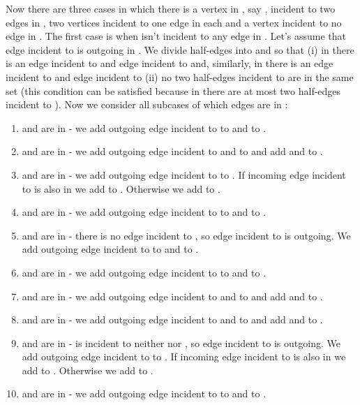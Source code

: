 \documentclass[a4, 11pt]{article}
\newcommand{\<}{\langle}
\renewcommand{\>}{\rangle}
\begin{document}
Now there are three cases in which there is a vertex in , say , incident to two edges in , two vertices incident to one edge in  each and a vertex incident to no edge in . The first case is when  isn't incident to any edge in . Let's assume that edge incident to  is outgoing in . We divide half-edges into  and  so that (i) in  there is an edge incident to  and edge incident to  and, similarly, in  there is an edge incident to  and edge incident to  (ii) no two half-edges incident to  are in the same set (this condition can be satisfied because in  there are at most two half-edges incident to ). Now we consider all subcases of which edges are in :
\begin{enumerate}
	\item  and  are in  - we add outgoing edge incident to  to  and  to .
	\item  and  are in  - we add outgoing edge incident to  and  to  and add  and  to .
	\item  and  are in  - we add outgoing edge incident to  to . If incoming edge incident to  is also in  we add  to . Otherwise we add  to .
	\item  and  are in  - we add outgoing edge incident to  to  and  to .
	\item  and  are in  - there is no edge incident to , so edge incident to  is outgoing. We add outgoing edge incident to  to  and  to .
	\item  and  are in  - we add outgoing edge incident to  to  and  to .
	\item  and  are in  - we add outgoing edge incident to  and  to  and add  and  to .
	\item  and  are in  - we add outgoing edge incident to  and  to  and add  and  to .
	\item  and  are in  -  is incident to neither  nor , so edge incident to  is outgoing. We add outgoing edge incident to  to . If incoming edge incident to  is also in  we add  to . Otherwise we add  to .
	\item  and  are in  - we add outgoing edge incident to  to  and  to .
\end{enumerate}
\end{document}
